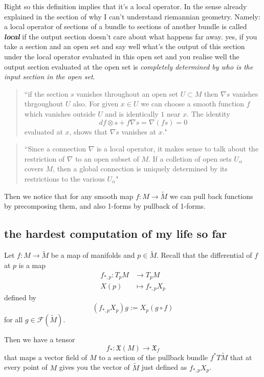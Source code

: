 Right so this definition implies that it's a local operator. In the sense already explained in the section of why I can't understand riemannian geometry. Namely: a local operator of sections of a bundle to sections of another bundle is called \textit{\textbf{local}} if the output section doesn't care about what happens far away. yes, if you take a section and an open set and say well what's the output of this section under the local operator evaluated in this open set and you realise well the output section evaluated at the open set is \textit{completely determined by who is the input section in the open set}.

\begin{quotation}
	``if the section \(s\) vanishes throughout an open set \(U \subset M\) then \(\nabla s\) vanishes thrgoughout \(U\) also. For given \(x \in U\) we can choose a smooth function \(f\) which vanishes outside \(U\) and is identically \(1\) near \(x\). The identity
	\[df \otimes s+ f \nabla s=\nabla(fs)=0\]
evaluated at \(x\), shows that \(\nabla s\) vanishes at \(x\)."	
\end{quotation}
\begin{quotation}
	``Since a connection \(\nabla\) is a local operator, it makes sense to talk about the restriction of \(\nabla\) to an open subset of \(M\). If a colletion of open sets \(U_\alpha\) covers \(M\), then a global connection is uniquely determined by its restrictions to the various \(U_\alpha\)"
\end{quotation}


Then we notice that for any smooth map \(f:M \to \widetilde{M}\) we can pull back functions by precomposing them, and also 1-forms by pullback of 1-forms.

\subsection{the hardest computation of my life so far}
Let \(f:M \to \tilde{M}\) be a map of manifolds and \(p \in \tilde{M}\).  Recall that the differential of \(f\) at \(p\) is a map
\begin{align*}
	f_{*,p}: T_pM &\longrightarrow T_pM \\
	X(p) &\longmapsto f_{*,p}X_p
\end{align*}
defined by
\[(f_{*,p}X_p)g:=X_p(g \circ f)\]
for all \(g \in \mathcal{F}(\tilde{M})\).

Then we have a tensor
\[f_*:\mathfrak{X}(M) \longrightarrow \mathfrak{X}_f\]
that maps a vector field of \(M\) to a section of the pullback bundle \(f^*T\tilde{M}\) that at every point  of \(M\) gives you the vector of \(\tilde{M}\) just defined as \(f_{*,p}X_p\).

